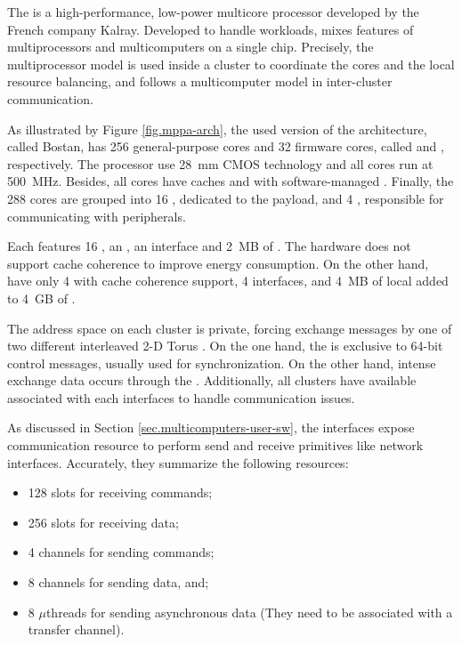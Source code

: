		The \mppa is a high-performance, low-power multicore processor
		developed by the French company Kalray.
		Developed to handle \mimd workloads, \mppa mixes features of
		multiprocessors and multicomputers on a single chip.
		Precisely, the multiprocessor model is used inside a cluster
		to coordinate the cores and the local resource balancing, and
		follows a multicomputer model in inter-cluster communication.

		As illustrated by Figure \ref{fig.mppa-arch}, the used version of
		the architecture, called Bostan, has 256 general-purpose cores and
		32 firmware cores, called \pes and \rmans, respectively.
		The processor use 28~mm CMOS technology and all cores run at 500~MHz.
		Besides, all cores have caches and \mmus with software-managed \tlbs.
		Finally, the 288 cores are grouped into 16 \cclusters, dedicated to
		the payload, and 4 \ioclusters, responsible for communicating with peripherals.

		Each \ccluster features 16 \pes, an \rman, an \noc interface and 2~MB of \sram.
		The hardware does not support cache coherence to improve energy consumption.
		On the other hand, \ioclusters have only 4 \rmans with cache coherence support,
		4 \noc interfaces, and 4~MB of local \sram added to 4~GB of \dram.

		The address space on each cluster is private, forcing exchange messages
		by one of two different interleaved 2-D Torus \nocs.
		On the one hand, the \cnoc is exclusive to 64-bit control messages,
		usually used for synchronization.
		On the other hand, intense exchange data occurs through the \dnoc.
		Additionally, all clusters have available \dmas associated with each
		\noc interfaces to handle communication issues.

		As discussed in Section \ref{sec.multicomputers-user-sw}, the \noc interfaces
		expose communication resource to perform send and receive primitives
		like network interfaces.
		Accurately, they summarize the following resources:

		\begin{itemize}
			\item 128 slots for receiving commands;
			\item 256 slots for receiving data;
			\item 4 channels for sending commands;
			\item 8 channels for sending data, and;
			\item 8 $\mu$threads for sending asynchronous data
				(They need to be associated with a transfer channel).
		\end{itemize}

